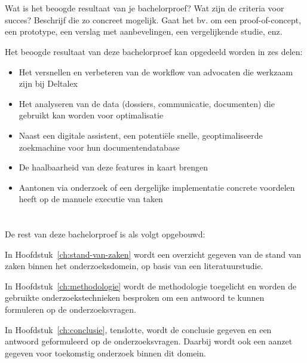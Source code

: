 \section{}%
\label{sec:onderzoeksdoelstelling}
Wat is het beoogde resultaat van je bachelorproef?
Wat zijn de criteria voor succes? Beschrijf die zo concreet mogelijk. Gaat het bv. om een proof-of-concept, een prototype, een verslag met aanbevelingen, een vergelijkende studie, enz.

Het beoogde resultaat van deze bachelorproef kan opgedeeld worden in zes delen:
\begin{itemize}
	\item Het versnellen en verbeteren van de workflow van advocaten die werkzaam zijn bij Deltalex
    \item Het analyseren van de data (dossiers, communicatie, documenten) die gebruikt kan worden voor optimalisatie
    \item Naast een digitale assistent, een potentiële snelle, geoptimaliseerde zoekmachine voor hun documentendatabase
    \item De haalbaarheid van deze features in kaart brengen
    \item Aantonen via onderzoek of een dergelijke implementatie concrete voordelen heeft op de manuele executie van taken
\end{itemize}


\section{}%
\label{sec:opzet-bachelorproef}


De rest van deze bachelorproef is als volgt opgebouwd:

In Hoofdstuk~\ref{ch:stand-van-zaken} wordt een overzicht gegeven van de stand van zaken binnen het onderzoeksdomein, op basis van een literatuurstudie.

In Hoofdstuk~\ref{ch:methodologie} wordt de methodologie toegelicht en worden de gebruikte onderzoekstechnieken besproken om een antwoord te kunnen formuleren op de onderzoeksvragen.


In Hoofdstuk~\ref{ch:conclusie}, tenslotte, wordt de conclusie gegeven en een antwoord geformuleerd op de onderzoeksvragen. Daarbij wordt ook een aanzet gegeven voor toekomstig onderzoek binnen dit domein.
